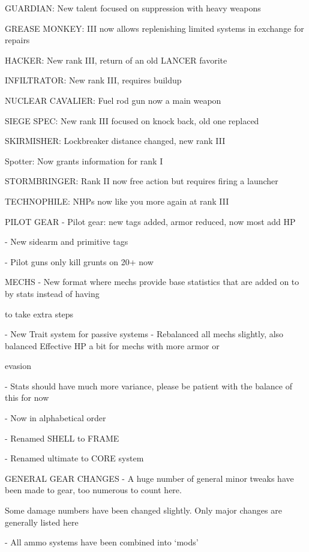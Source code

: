 GUARDIAN: New talent focused on suppression with heavy weapons

GREASE MONKEY:  III now allows replenishing limited systems in exchange for repairs

HACKER: New rank III, return of an old LANCER favorite





INFILTRATOR: New rank III, requires buildup

NUCLEAR CAVALIER: Fuel rod gun now a main weapon

SIEGE SPEC: New rank III focused on knock back, old one replaced


SKIRMISHER: Lockbreaker distance changed, new rank III

Spotter: Now grants information for rank I


STORMBRINGER: Rank II now free action but requires firing a launcher

TECHNOPHILE: NHPs now like you more again at rank III


PILOT GEAR
    -    Pilot gear: new tags added, armor reduced, now most add HP

    -    New sidearm and primitive tags

    -    Pilot guns only kill grunts on 20+ now


MECHS
    -    New format where mechs provide base statistics that are added on to by stats instead of having

         to take extra steps

    -    New Trait system for passive systems
    -    Rebalanced all mechs slightly, also balanced Effective HP a bit for mechs with more armor or

         evasion

    -    Stats should have much more variance, please be patient with the balance of this for now

    -    Now in alphabetical order


    -    Renamed SHELL to FRAME

    -    Renamed ultimate to CORE system


GENERAL GEAR CHANGES
    -    A huge number of general minor tweaks have been made to gear, too numerous to count here.

         Some damage numbers have been changed slightly. Only major changes are generally listed here

    -    All ammo systems have been combined into ‘mods'

